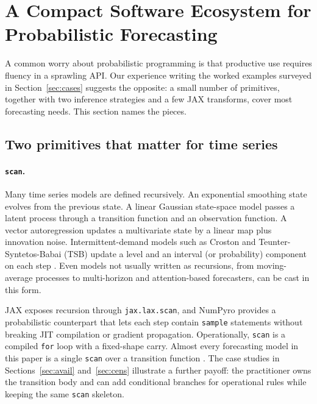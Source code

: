 \documentclass[11pt,3p,review,authoryear]{elsarticle}
\begin{document}
\section{A Compact Software Ecosystem for Probabilistic Forecasting}
\label{sec:ecosystem}

A common worry about probabilistic programming is that productive use requires fluency in a sprawling API. Our experience writing the worked examples surveyed in Section~\ref{sec:cases} suggests the opposite: a small number of primitives, together with two inference strategies and a few JAX transforms, cover most forecasting needs. This section names the pieces.

\subsection{Two primitives that matter for time series}

\paragraph{\texttt{scan}.}
Many time series models are defined recursively. An exponential smoothing state evolves from the previous state. A linear Gaussian state-space model passes a latent process through a transition function and an observation function. A vector autoregression updates a multivariate state by a linear map plus innovation noise. Intermittent-demand models such as Croston and Teunter-Syntetos-Babai (TSB) update a level and an interval (or probability) component on each step \citep{croston1972forecasting, teunter2011intermittent}. Even models not usually written as recursions, from moving-average processes to multi-horizon and attention-based forecasters, can be cast in this form.

JAX exposes recursion through \texttt{jax.lax.scan}, and NumPyro provides a probabilistic counterpart that lets each step contain \texttt{sample} statements without breaking JIT compilation or gradient propagation. Operationally, \texttt{scan} is a compiled \texttt{for} loop with a fixed-shape carry. Almost every forecasting model in this paper is a single \texttt{scan} over a transition function \citep{orduz_exponential_smoothing, orduz_arma, orduz_var}. The case studies in Sections~\ref{sec:avail} and~\ref{sec:cens} illustrate a further payoff: the practitioner owns the transition body and can add conditional branches for operational rules while keeping the same \texttt{scan} skeleton.
\end{document}
